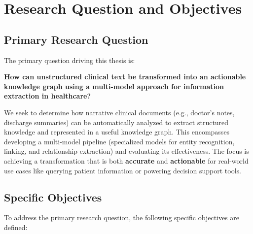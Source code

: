 
\section{Research Question and Objectives}

\subsection{Primary Research Question}

The primary question driving this thesis is:

\textbf{How can unstructured clinical text be transformed into an actionable knowledge graph using a multi-model approach for information extraction in healthcare?}

We seek to determine how narrative clinical documents (e.g., doctor's notes, discharge summaries) can be automatically analyzed to extract structured knowledge and represented in a useful knowledge graph. This encompasses developing a multi-model pipeline (specialized models for entity recognition, linking, and relationship extraction) and evaluating its effectiveness. The focus is achieving a transformation that is both \textbf{accurate} and \textbf{actionable} for real-world use cases like querying patient information or powering decision support tools.

\subsection{Specific Objectives}

To address the primary research question, the following specific objectives are defined:


